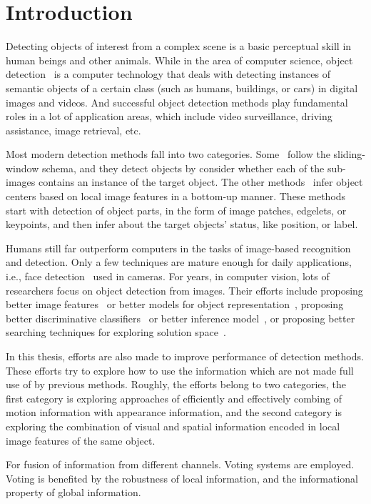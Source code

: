 \chapter{Introduction}
Detecting objects of interest from a complex scene is a basic perceptual skill in human beings and other animals.
While in the area of computer science, object detection~\citep{dod} is a computer technology that deals with detecting instances of semantic objects of a certain class (such as humans, buildings, or cars) in digital images and videos. And successful object detection
methods play fundamental roles in a lot of application areas, which include video surveillance, driving assistance, image retrieval, etc.

Most modern detection methods fall into two categories. Some~\citep{ij4,ac31,ac30,ac4,ac32,ac29,ac28,ac1} follow the sliding-window schema, and they detect objects by consider whether each of the sub-images contains an instance of the target object. The other methods~\citep{ac9,ac2,ac3,ac22,lb1,ac5,ac10,ac21,ac18} infer object centers based on local image features in a bottom-up manner. These methods start with detection of object parts, in the form of image patches, edgelets, or keypoints, and then infer about the target objects' status, like position, or label.


 Humans still far outperform computers in the tasks of image-based recognition and detection. Only a few techniques are mature enough for daily applications, i.e., face detection~\citep{face} used in cameras. For years, in computer vision, lots of researchers focus on object detection from images. Their efforts include proposing better image features~\citep{o17} or better models for object representation~\citep{bgf}, proposing better discriminative classifiers~\citep{dlearn} or better inference model~\citep{hdp}, or proposing better searching techniques for exploring solution space~\citep{bab}.

 In this thesis, efforts are also made to improve performance of detection methods. These efforts try to explore how to use the information which are not made full use of by previous methods. Roughly, the efforts belong to two categories, the first category is exploring approaches of efficiently and effectively combing of motion information with appearance information, and the second category is exploring the combination of visual and spatial information encoded in local image features of the same object.

For fusion of information from different channels. Voting systems are employed. Voting is benefited by the robustness of local information, and the informational property of global information.

